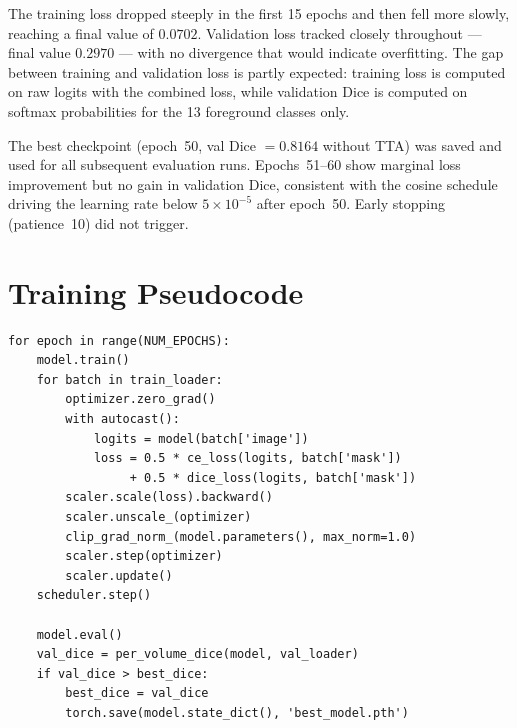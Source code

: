\FloatBarrier

The training loss dropped steeply in the first 15 epochs and then fell more slowly, reaching a final value of $0.0702$. Validation loss tracked closely throughout --- final value $0.2970$ --- with no divergence that would indicate overfitting. The gap between training and validation loss is partly expected: training loss is computed on raw logits with the combined loss, while validation Dice is computed on softmax probabilities for the 13 foreground classes only.

The best checkpoint (epoch~50, val Dice $= 0.8164$ without TTA) was saved and used for all subsequent evaluation runs. Epochs~51--60 show marginal loss improvement but no gain in validation Dice, consistent with the cosine schedule driving the learning rate below $5 \times 10^{-5}$ after epoch~50. Early stopping (patience~10) did not trigger.

\section{Training Pseudocode}

\begin{verbatim}
for epoch in range(NUM_EPOCHS):
    model.train()
    for batch in train_loader:
        optimizer.zero_grad()
        with autocast():
            logits = model(batch['image'])
            loss = 0.5 * ce_loss(logits, batch['mask'])
                 + 0.5 * dice_loss(logits, batch['mask'])
        scaler.scale(loss).backward()
        scaler.unscale_(optimizer)
        clip_grad_norm_(model.parameters(), max_norm=1.0)
        scaler.step(optimizer)
        scaler.update()
    scheduler.step()

    model.eval()
    val_dice = per_volume_dice(model, val_loader)
    if val_dice > best_dice:
        best_dice = val_dice
        torch.save(model.state_dict(), 'best_model.pth')
\end{verbatim}
